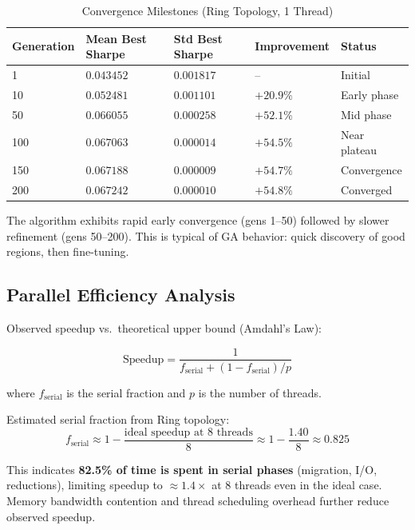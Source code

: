 \documentclass[12pt,a4paper]{article}
\begin{document}
\begin{longtable}[htp]{|p{2cm}|p{2cm}|p{2cm}|p{2cm}|p{2cm}|}
\caption{Convergence Milestones (Ring Topology, 1 Thread)}
\label{Table:Convergence}
\hline
\textbf{Generation} & \textbf{Mean Best Sharpe} & \textbf{Std Best Sharpe} & \textbf{Improvement} & \textbf{Status} \\
\hline
1 & $0.043452$ & $0.001817$ & -- & Initial \\
\hline
10 & $0.052481$ & $0.001101$ & $+20.9\%$ & Early phase \\
\hline
50 & $0.066055$ & $0.000258$ & $+52.1\%$ & Mid phase \\
\hline
100 & $0.067063$ & $0.000014$ & $+54.5\%$ & Near plateau \\
\hline
150 & $0.067188$ & $0.000009$ & $+54.7\%$ & Convergence \\
\hline
200 & $0.067242$ & $0.000010$ & $+54.8\%$ & Converged \\
\hline
\end{longtable}

The algorithm exhibits rapid early convergence (gens 1--50) followed by slower refinement (gens 50--200). This is typical of GA behavior: quick discovery of good regions, then fine-tuning.

\subsection{Parallel Efficiency Analysis}

Observed speedup vs.~theoretical upper bound (Amdahl's Law):

\begin{equation}
\text{Speedup} = \frac{1}{f_{\text{serial}} + (1 - f_{\text{serial}}) / p}
\label{eq:amdahl}
\end{equation}

\noindent where $f_{\text{serial}}$ is the serial fraction and $p$ is the number of threads.

Estimated serial fraction from Ring topology:
\begin{equation}
f_{\text{serial}} \approx 1 - \frac{\text{ideal speedup at 8 threads}}{8} \approx 1 - \frac{1.40}{8} \approx 0.825
\label{eq:serial_frac}
\end{equation}

This indicates \textbf{82.5\% of time is spent in serial phases} (migration, I/O, reductions), limiting speedup to $\approx 1.4 \times$ at 8 threads even in the ideal case. Memory bandwidth contention and thread scheduling overhead further reduce observed speedup.
\end{document}
